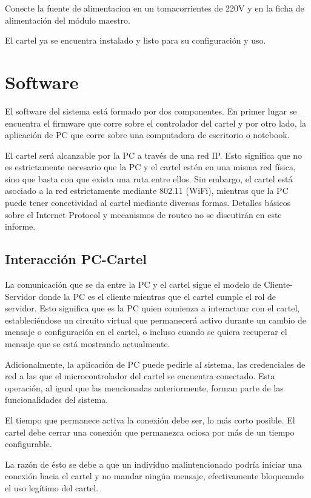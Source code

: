 Conecte la fuente de alimentacion en un tomacorrientes de 220V y en la ficha de alimentación del módulo maestro.

El cartel ya se encuentra instalado y listo para su configuración y uso.

\pagebreak
\section{Software}\label{sec:sw}
El software del sistema está formado por dos componentes. En primer lugar se encuentra el firmware que corre sobre el controlador del cartel y por otro lado, la aplicación de PC que corre sobre una computadora de escritorio o notebook.

El cartel será alcanzable por la PC a través de una red IP. Esto significa que no es estrictamente necesario que la PC y el cartel estén en una misma red física, sino que basta con que exista una ruta entre ellos. Sin embargo, el cartel está asociado a la red estrictamente mediante 802.11 (WiFi), mientras que la PC puede tener conectividad al cartel mediante diversas formas. Detalles básicos sobre el Internet Protocol y mecanismos de routeo no se discutirán en este informe.

\subsection{Interacción PC-Cartel}
La comunicación que se da entre la PC y el cartel sigue el modelo de Cliente-Servidor donde la PC es el cliente mientras que el cartel cumple el rol de servidor. Esto significa que es la PC quien comienza a interactuar con el cartel, estableciéndose un circuito virtual que permanecerá activo durante un cambio de mensaje o configuración en el cartel, o incluso cuando se quiera recuperar el mensaje que se está mostrando actualmente.

Adicionalmente, la aplicación de PC puede pedirle al sistema, las credenciales de red a las que el microcontrolador del cartel se encuentra conectado. Esta operación, al igual que las mencionadas anteriormente, forman parte de las funcionalidades del sistema.

El tiempo que permanece activa la conexión debe ser, lo más corto posible. El cartel debe cerrar una conexión que permanezca ociosa por más de un tiempo configurable.

La razón de ésto se debe a que un individuo malintencionado podría iniciar una conexión hacia el cartel y no mandar ningún mensaje, efectivamente bloqueando el uso legítimo del cartel.

